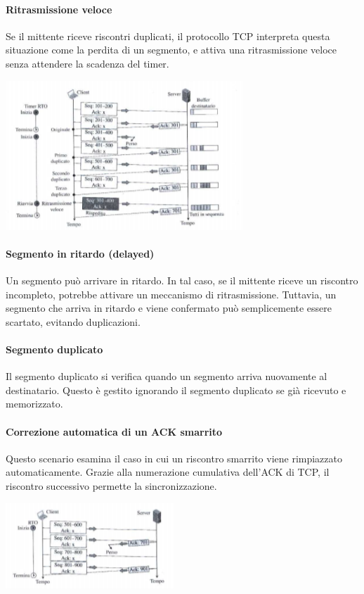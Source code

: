 \documentclass[12pt]{report}
\begin{document}
	\paragraph{Ritrasmissione veloce} Se il mittente riceve riscontri duplicati, il protocollo TCP interpreta questa situazione come la perdita di un segmento, e attiva una ritrasmissione veloce senza attendere la scadenza del timer.
	\begin{center}
		\includegraphics[scale=1.0]{assets/scenario3.png}
	\end{center}	
	
	\paragraph{Segmento in ritardo (delayed)} Un segmento può arrivare in ritardo. In tal caso, se il mittente riceve un riscontro incompleto, potrebbe attivare un meccanismo di ritrasmissione. Tuttavia, un segmento che arriva in ritardo e viene confermato può semplicemente essere scartato, evitando duplicazioni.

	
	\paragraph{Segmento duplicato} Il segmento duplicato si verifica quando un segmento arriva nuovamente al destinatario. Questo è gestito ignorando il segmento duplicato se già ricevuto e memorizzato.
	
	\paragraph{Correzione automatica di un ACK smarrito} Questo scenario esamina il caso in cui un riscontro smarrito viene rimpiazzato automaticamente. Grazie alla numerazione cumulativa dell'ACK di TCP, il riscontro successivo permette la sincronizzazione.
	\begin{center}
		\includegraphics[scale=1.2]{assets/scenario4.png}
	\end{center}
	
\end{document}
